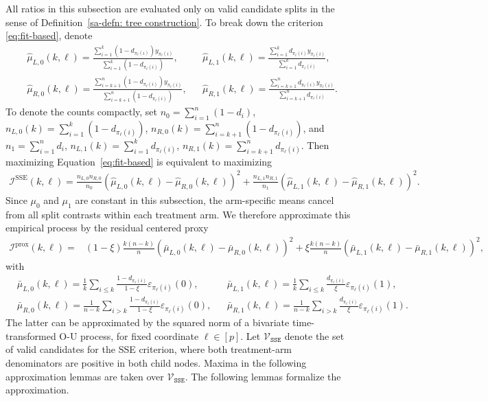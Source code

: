 \documentclass[10pt]{article}
\def\I{\mathscr{I}}
\theoremstyle{definition}
\theoremstyle{remark}
\begin{document}
All ratios in this subsection are evaluated only on valid candidate splits in the sense of Definition~\ref{sa-defn: tree construction}. To break down the criterion \eqref{eq:fit-based}, denote
\begin{align*}
    & \hat \mu_{L,0}(k,\ell) = \frac{\sum_{i = 1}^k (1 - d_{\pi_{\ell}(i)}) y_{\pi_{\ell}(i)}}{\sum_{i = 1}^k (1 - d_{\pi_{\ell}(i)})}, && \hat \mu_{L,1}(k,\ell)  = \frac{\sum_{i = 1}^k d_{\pi_{\ell}(i)} y_{\pi_{\ell}(i)}}{\sum_{i = 1}^k d_{\pi_{\ell}(i)}}, \\
    & \hat \mu_{R,0}(k,\ell) = \frac{\sum_{i = k+1}^n (1 - d_{\pi_{\ell}(i)}) y_{\pi_{\ell}(i)}}{\sum_{i = k+1}^n (1 - d_{\pi_{\ell}(i)})}, && \hat \mu_{R,1}(k,\ell) = \frac{\sum_{i = k+1}^n d_{\pi_{\ell}(i)} y_{\pi_{\ell}(i)}}{\sum_{i = k+1}^n d_{\pi_{\ell}(i)}}.
\end{align*}
To denote the counts compactly, set $n_0 = \sum_{i = 1}^n (1 - d_i)$, $n_{L,0}(k) = \sum_{i = 1}^k (1 - d_{\pi_{\ell}(i)})$, $n_{R,0}(k) = \sum_{i  = k + 1}^n (1 - d_{\pi_{\ell}(i)})$, and $n_1 = \sum_{i = 1}^n d_i$, $n_{L,1}(k) = \sum_{i = 1}^k d_{\pi_{\ell}(i)}$, $n_{R,1}(k) = \sum_{i  = k + 1}^n d_{\pi_{\ell}(i)}$. Then maximizing Equation~\eqref{eq:fit-based} is equivalent to maximizing
\begin{align*}
    \I^\text{SSE}(k, \ell) = \frac{n_{L,0} n_{R,0}}{n_0} (\hat \mu_{L,0}(k,\ell) - \hat \mu_{R,0}(k,\ell))^2 + \frac{n_{L,1} n_{R,1}}{n_1} (\hat \mu_{L,1}(k,\ell) - \hat \mu_{R,1}(k,\ell))^2.
\end{align*}
Since $\mu_0$ and $\mu_1$ are constant in this subsection, the arm-specific means cancel from all split contrasts within each treatment arm. We therefore approximate this empirical process by the residual centered proxy
\begin{align*}
    \I^\text{prox}(k, \ell) = & (1 - \xi)  \frac{k (n - k)}{n} (\bar \mu_{L,0}(k,\ell) - \bar \mu_{R,0}(k,\ell))^2  + \xi \frac{k (n - k)}{n} (\bar \mu_{L,1}(k,\ell) - \bar \mu_{R,1}(k,\ell))^2,
\end{align*}
with 
\begin{align*}
    & \bar \mu_{L,0}(k,\ell) = \frac{1}{k}\sum_{i \leq k} \frac{1 - d_{\pi_\ell(i)}}{1 - \xi} \varepsilon_{\pi_\ell(i)}(0), && \bar \mu_{L,1}(k,\ell)  =  \frac{1}{k}\sum_{i \leq k} \frac{d_{\pi_\ell(i)}}{\xi} \varepsilon_{\pi_\ell(i)}(1), \\
    & \bar \mu_{R,0}(k,\ell) = \frac{1}{n - k}\sum_{i > k} \frac{1 - d_{\pi_\ell(i)}}{1 - \xi} \varepsilon_{\pi_\ell(i)}(0), && \bar \mu_{R,1}(k,\ell) = \frac{1}{n - k}\sum_{i > k} \frac{d_{\pi_\ell(i)}}{\xi} \varepsilon_{\pi_\ell(i)}(1).
\end{align*}
The latter can be approximated by the squared norm of a bivariate time-transformed O-U process, for fixed coordinate $\ell \in [p]$. Let $\mathcal{V}_{\mathtt{SSE}}$ denote the set of valid candidates for the SSE criterion, where both treatment-arm denominators are positive in both child nodes. Maxima in the following approximation lemmas are taken over $\mathcal{V}_{\mathtt{SSE}}$. The following lemmas formalize the approximation.
\end{document}
